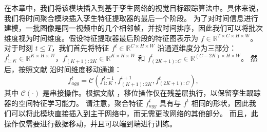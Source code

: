 在本章中，我们将该模块插入到基于孪生网络的视觉目标跟踪算法中。具体来说，我们将时间聚合模块插入孪生特征提取器的最后一个阶段。
为了对时间信息进行建模，一批图像是同一视频中的几个相邻帧，并按时间排序，因此我们可以将批次维度视为时间维度。假设特征提取器最后阶段的特征图表示为 $f \in \mathbb R ^ {T \times C \times H \times W}$。
对于时刻 $t \leq T$，我们首先将特征 $f^t \in \mathbb R ^ {C \times H \times W}$ 沿通道维度分为三部分：$f_{1:K}^t \in \mathbb R ^ {K \times H \times W}$，$f_{(K+1):2K}^t \in \mathbb R ^ {K \times H \times W}$ 和 $f_{(2K+1):C}^t \in \mathbb R ^ {(C-2K) \times H \times W}$。
然后，按照文献 \cite{lin2019tsm} 沿时间维度移动通道：
\begin{equation}
    f_{agg}^t = \mathcal{C}(f_{{1:K}}^{t-1}, f_{(K+1):2K}^{t+1}, f_{(2K+1):C}^{t}),
\end{equation}
其中 $\mathcal{C}(\cdot)$ 是串接操作。根据文献 \cite{lin2019tsm}，移位操作仅在残差层执行，以保留孪生跟踪器的空间特征学习能力。
请注意，聚合特征 $f_{agg}^t$ 具有与 $f^t$ 相同的形状，因此我们可以将此模块直接插入到主干网络中，而无需更改网络的其他部分。
而且，此操作仅需要进行数据移动，并且可以端到端进行训练。


